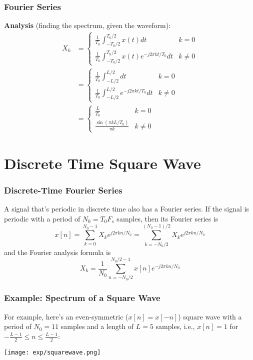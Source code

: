 \documentclass{beamer}
\begin{document}
\begin{frame}
  \frametitle{Fourier Series}

  {\bf Analysis}  (finding the spectrum, given the waveform):
  \begin{align*}
    X_k &= \begin{cases}
      \frac{1}{T_0}\int_{-T_0/2}^{T_0/2} x(t)dt & k=0\\
      \frac{1}{T_0}\int_{-T_0/2}^{T_0/2} x(t)e^{-j2\pi kt/T_0}dt & k\ne 0
    \end{cases}\\
    &= \begin{cases}
      \frac{1}{T_0}\int_{-L/2}^{L/2} dt & k=0\\
      \frac{1}{T_0}\int_{-L/2}^{L/2} e^{-j2\pi kt/T_0}dt & k\ne 0
    \end{cases}\\
    &= \begin{cases}
      \frac{L}{T_0} & k=0\\
      \frac{\sin(\pi kL/T_0)}{\pi k} & k\ne 0
    \end{cases}
  \end{align*}
\end{frame}

\section[DT]{Discrete Time Square Wave}
\setcounter{subsection}{1}


\begin{frame}
  \frametitle{Discrete-Time Fourier Series}

  A signal that's periodic in discrete time also has a Fourier series.
  If the signal is periodic with a period of $N_0=T_0F_s$ samples,
  then its Fourier series is
  \[
  x[n] = \sum_{k=0}^{N_0-1} X_k e^{j2\pi kn/N_0} =\sum_{k=-N_0/2}^{(N_0-1)/2} X_k e^{j2\pi kn/N_0}
  \]
  and the Fourier analysis formula is
  \[
  X_k = \frac{1}{N_0}\sum_{n=-N_0/2}^{N_0/2-1} x[n]e^{-j2\pi kn/N_0}  
  \]
\end{frame}

\begin{frame}
  \frametitle{Example: Spectrum of a Square Wave}

  For example, here's an even-symmetric ($x[n]=x[-n]$) square wave
  with a period of $N_0=11$ samples and a length of $L=5$ samples, i.e.,
  $x[n]=1$ for $-\frac{L-1}{2}\le n\le\frac{L-1}{2}$:
  \centerline{\texttt{[image: exp/squarewave.png]}}
\end{frame}
\end{document}
